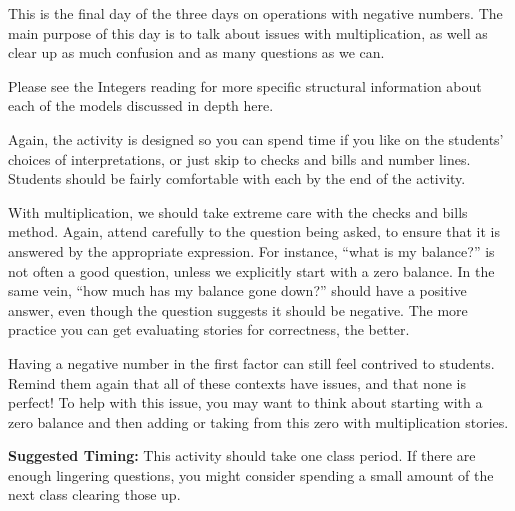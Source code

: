 \documentclass{ximera}
\begin{document}
\newpage
\begin{instructorNotes}
This is the final day of the three days on operations with negative numbers.  The main purpose of this day is to talk about issues with multiplication, as well as clear up as much confusion and as many questions as we can.

Please see the Integers reading for more specific structural information about each of the models discussed in depth here.

Again, the activity is designed so you can spend time if you like on the students' choices of interpretations, or just skip to checks and bills and number lines.  Students should be fairly comfortable with each by the end of the activity.

With multiplication, we should take extreme care with the checks and bills method.  Again, attend carefully to the question being asked, to ensure that it is answered by the appropriate expression.  For instance, ``what is my balance?'' is not often a good question, unless we explicitly start with a zero balance.  In the same vein, ``how much has my balance gone down?'' should have a positive answer, even though the question suggests it should be negative.  The more practice you can get evaluating stories for correctness, the better.

Having a negative number in the first factor can still feel contrived to students.  Remind them again that all of these contexts have issues, and that none is perfect!  To help with this issue, you may want to think about starting with a zero balance and then adding or taking from this zero with multiplication stories.  

{\bf Suggested Timing:} This activity should take one class period.  If there are enough lingering questions, you might consider spending a small amount of the next class clearing those up.
\end{instructorNotes}
\end{document}
